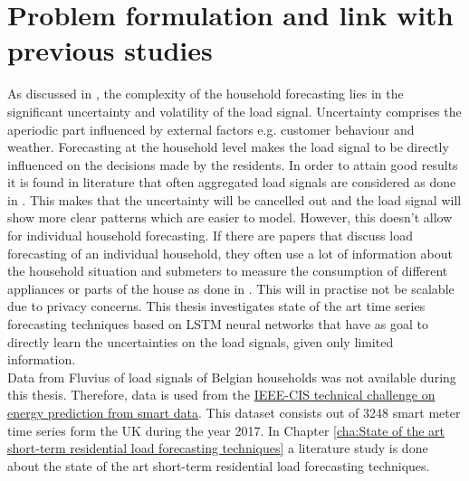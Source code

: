 \section{Problem formulation and link with previous studies}
As discussed in \cite{Shi2018}, the complexity of the household forecasting lies in the significant uncertainty and volatility of the load signal. Uncertainty comprises the aperiodic part influenced by external factors e.g. customer behaviour and weather. Forecasting at the household level makes the load signal to be directly influenced on the decisions made by the residents. In order to attain good results it is found in literature that often aggregated load signals are considered as done in \cite{loadforecastingmoor}. This makes that the uncertainty will be cancelled out and the load signal will show more clear patterns which are easier to model. However, this doesn't allow for individual household forecasting. If there are papers that discuss load forecasting of an individual household, they often use a lot of information about the household situation and submeters to measure the consumption of different appliances or parts of the house as done in \cite{Kim2019}. This will in practise not be scalable due to privacy concerns. This thesis investigates state of the art time series forecasting techniques based on LSTM neural networks that have as goal to directly learn the uncertainties on the load signals, given only limited information.\\

Data from Fluvius of load signals of Belgian households was not available during this thesis. Therefore, data is used from the \href{https://ieee-dataport.org/competitions/ieee-cis-technical-challenge-energy-prediction-smart-meter-data}{IEEE-CIS technical challenge on energy prediction from smart data}. This dataset consists out of 3248 smart meter time series form the UK during the year 2017. In Chapter \ref{cha:State of the art short-term residential load forecasting techniques} a literature study is done about the state of the art short-term residential load forecasting techniques. 


